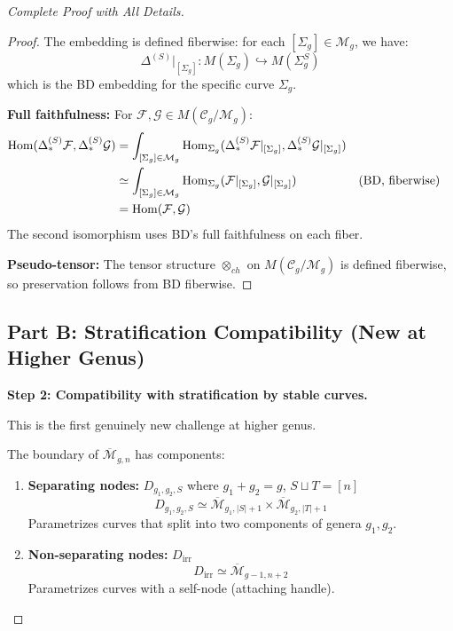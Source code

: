 \begin{proof}[Complete Proof with All Details]
\begin{proof}
The embedding is defined fiberwise: for each $[\Sigma_g] \in \mathcal{M}_g$, we have:
$$\Delta^{(S)}|_{[\Sigma_g]}: M(\Sigma_g) \hookrightarrow M(\Sigma_g^S)$$
which is the BD embedding for the specific curve $\Sigma_g$.

\textbf{Full faithfulness:} For $\mathcal{F}, \mathcal{G} \in M(\mathcal{C}_g/\mathcal{M}_g)$:
\begin{align*}
\operatorname{Hom}(\Delta^{(S)}_* \mathcal{F}, \Delta^{(S)}_* \mathcal{G}) 
&= \int_{[\Sigma_g] \in \mathcal{M}_g} \operatorname{Hom}_{\Sigma_g}(\Delta^{(S)}_* \mathcal{F}|_{[\Sigma_g]}, \Delta^{(S)}_* \mathcal{G}|_{[\Sigma_g]}) \\
&\simeq \int_{[\Sigma_g] \in \mathcal{M}_g} \operatorname{Hom}_{\Sigma_g}(\mathcal{F}|_{[\Sigma_g]}, \mathcal{G}|_{[\Sigma_g]}) && \text{(BD, fiberwise)} \\
&= \operatorname{Hom}(\mathcal{F}, \mathcal{G})
\end{align*}
The second isomorphism uses BD's full faithfulness on each fiber.

\textbf{Pseudo-tensor:} The tensor structure $\otimes_{ch}$ on $M(\mathcal{C}_g/\mathcal{M}_g)$ is defined fiberwise, so preservation follows from BD fiberwise. \qedhere
\end{proof}

\subsection*{Part B: Stratification Compatibility (New at Higher Genus)}

\textbf{Step 2: Compatibility with stratification by stable curves.}

This is the first genuinely new challenge at higher genus.

\begin{definition}\label{def:boundary-strata}
The boundary of $\overline{\mathcal{M}}_{g,n}$ has components:
\begin{enumerate}
\item \textbf{Separating nodes:} $D_{g_1,g_2,S}$ where $g_1 + g_2 = g$, $S \sqcup T = [n]$
$$D_{g_1,g_2,S} \simeq \overline{\mathcal{M}}_{g_1, |S|+1} \times \overline{\mathcal{M}}_{g_2, |T|+1}$$
Parametrizes curves that split into two components of genera $g_1, g_2$.

\item \textbf{Non-separating nodes:} $D_{\text{irr}}$
$$D_{\text{irr}} \simeq \overline{\mathcal{M}}_{g-1, n+2}$$
Parametrizes curves with a self-node (attaching handle).
\end{enumerate}
\end{definition}


\end{proof}
